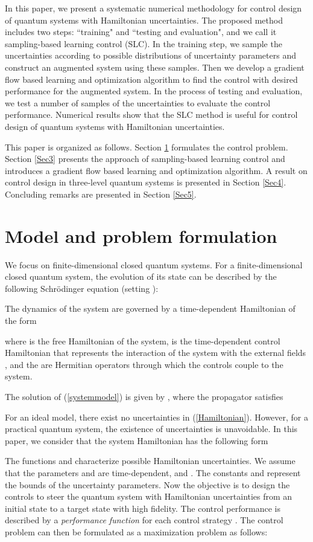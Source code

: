 \documentclass[letterpaper, 10 pt, conference]{ieeeconf}
\begin{document}
In this paper, we present a systematic numerical methodology for control
design of quantum systems with Hamiltonian uncertainties.
The proposed method includes two steps: ``training" and ``testing
and evaluation", and we call it sampling-based learning control
(SLC). In the training step, we sample the uncertainties according to
possible distributions of uncertainty parameters and construct an
augmented system using these samples. Then we develop a gradient
flow based learning and optimization algorithm to find the control
with desired performance for the augmented system. In the
process of testing and evaluation, we test a number of
samples of the uncertainties to evaluate the control performance. Numerical
results show that the SLC method is useful for
control design of quantum systems with Hamiltonian uncertainties.

This paper is organized as follows. Section \ref{Sec2} formulates
the control problem. Section \ref{Sec3}  presents the
approach of sampling-based learning control and introduces  a gradient
flow based learning and optimization algorithm. A result on
control design in three-level quantum systems is
presented in Section \ref{Sec4}. Concluding remarks are
presented in Section \ref{Sec5}.

\section{Model and problem formulation}\label{Sec2}
We focus on finite-dimensional closed quantum systems. For a finite-dimensional closed quantum system, the
evolution of its state  can be described by the
following Schr\"{o}dinger equation (setting ):

The dynamics of the system are governed by a
time-dependent Hamiltonian of the form

where  is the free Hamiltonian of the system,
 is the time-dependent control
Hamiltonian that represents the interaction of the system with the
external fields , and the  are Hermitian operators through which the
controls couple to the system.

The solution of (\ref{systemmodel}) is given
by , where the
propagator  satisfies


For an ideal model, there exist no uncertainties in (\ref{Hamiltonian}). However, for a practical quantum system, the existence of uncertainties is unavoidable. In this paper, we consider that the system Hamiltonian has the following form

The functions  and  characterize possible Hamiltonian uncertainties. We assume that the parameters
 and   are time-dependent,  and . The constants
 and  represent the bounds of
the uncertainty parameters. Now the objective is to design the controls
 to steer the
quantum system with Hamiltonian uncertainties from an initial state  to a target
state  with high fidelity. The control
performance is described by a \emph{performance function}  for
each control strategy . The
control problem can then be formulated as a maximization problem as
follows:
\end{document}
